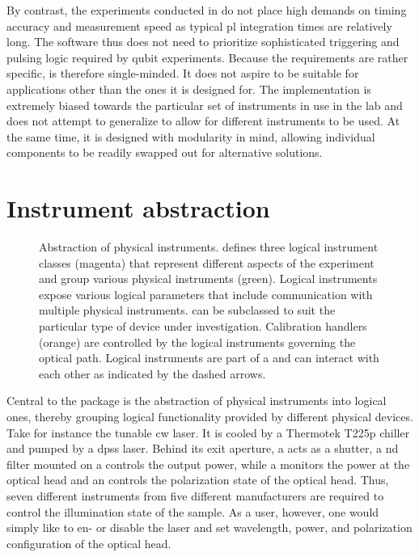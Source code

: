 By contrast, the experiments conducted in \thethesis do not place high demands on timing accuracy and measurement speed as typical \gls{pl} integration times are relatively long.
The software thus does not need to prioritize sophisticated triggering and pulsing logic required by qubit experiments.
Because the requirements are rather specific, \mjolnir is therefore single-minded.
It does not aspire to be suitable for applications other than the ones it is designed for.
The implementation is extremely biased towards the particular set of instruments in use in the lab and does not attempt to generalize to allow for different instruments to be used.
At the same time, it is designed with modularity in mind, allowing individual components to be readily swapped out for alternative solutions.

\section{Instrument abstraction}\label{sec:exp:mjolnir:instruments}
\begin{figure}
    \centering
    
    \caption[]{
        Abstraction of physical instruments.
        \mjolnir defines three logical instrument classes (magenta) that represent different aspects of the experiment and group various physical instruments (green).
        Logical instruments expose various logical parameters that include communication with multiple physical instruments.
         can be subclassed to suit the particular type of device under investigation.
        Calibration handlers (orange) are controlled by the logical instruments governing the optical path.
        Logical instruments are part of a \qcodes {} and can interact with each other as indicated by the dashed arrows.
    }
    \label{fig:exp:mjolnir:layout}
\end{figure}

Central to the \mjolnir package is the abstraction of physical instruments into logical ones, thereby grouping logical functionality provided by different physical devices.
Take for instance the tunable \gls{cw} \tisalaser laser.
It is cooled by a Thermotek T225p chiller and pumped by a \pumplaser \gls{dpss} laser.
Behind its exit aperture, a \thorlabsflipper acts as a shutter, a \gls{nd} filter mounted on a \thorlabsrotator controls the output power, while a \thorlabspowermeter monitors the power at the optical head and an \rotatorcontroller controls the polarization state of the optical head.
Thus, seven different instruments from five different manufacturers are required to control the illumination state of the sample.
As a user, however, one would simply like to en- or disable the laser and set wavelength, power, and polarization configuration of the optical head.

